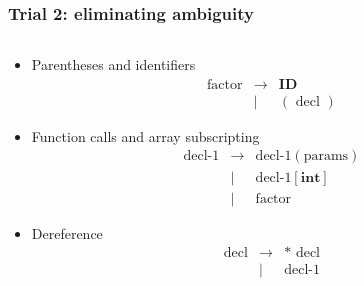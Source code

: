 \documentclass{beamer}
\begin{document}
\begin{frame}
    \frametitle{Trial 2: eliminating ambiguity}
    \begin{columns}
        \begin{column}[]{0.6\textwidth}
            \begin{itemize}
                \small
                \item Parentheses and identifiers
                      \begin{eqnarray*}
                          \text{factor} & \rightarrow & \textbf{ID} \\
                          & | & ( \text{ decl } )
                      \end{eqnarray*}
                \item Function calls and array subscripting
                      \begin{eqnarray*}
                          \text{decl-1} & \rightarrow & \text{decl-1}(\text{params}) \\
                          & | & \text{decl-1}[\textbf{int}]\\
                          & | &\text{factor}
                      \end{eqnarray*}
                \item Dereference
                      \begin{eqnarray*}
                          \text{decl} & \rightarrow & \textbf{*}\text{ decl} \\
                          & | & \text{decl-1}

\end{eqnarray*}
\end{itemize}
\end{column}
\end{columns}
\end{frame}
\end{document}
